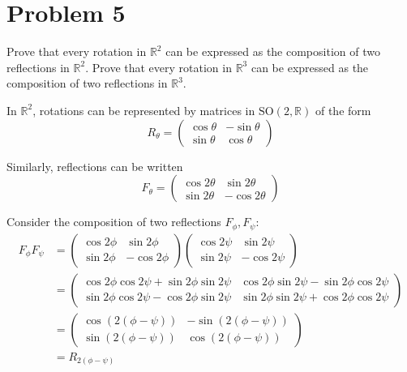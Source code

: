 \documentclass[12pt]{article}
\newcommand{\R}{\mathbb{R}}
\newcommand{\SO}{\text{SO}}
\begin{document}
\section*{Problem 5} Prove that every rotation in $\R^{2}$ can be expressed as the composition of two reflections in $\R^{2}$.  Prove that every rotation in $\R^{3}$ can be expressed as the composition of two reflections in $\R^{3}$.

    \color{blue}
        In $\R^2$, rotations can be represented by matrices in $\SO(2, \R)$ of the form 
        \[R_{\theta} = \begin{pmatrix}
            \cos \theta & -\sin \theta\\ 
            \sin \theta & \cos \theta
        \end{pmatrix}\] 

        Similarly, reflections can be written 
        \[F_{\theta} = \begin{pmatrix}
            \cos 2\theta & \sin 2\theta\\ 
            \sin 2\theta & -\cos 2\theta 
        \end{pmatrix}\]

        Consider the composition of two reflections $F_{\phi}, F_{\psi}$: 
        \begin{align*}
            F_{\phi}F_{\psi} &= \begin{pmatrix}
                \cos 2\phi & \sin 2\phi\\ 
                \sin 2\phi & -\cos 2\phi 
            \end{pmatrix} \begin{pmatrix}
                \cos 2\psi & \sin 2\psi\\ 
                \sin 2\psi & -\cos 2\psi
            \end{pmatrix}\\ 
            &= \begin{pmatrix}
                \cos 2\phi \cos 2\psi + \sin 2\phi \sin 2\psi & \cos 2\phi \sin 2\psi - \sin 2\phi \cos 2\psi\\ 
                \sin 2\phi \cos 2\psi - \cos 2\phi \sin 2\psi & \sin 2\phi \sin 2\psi + \cos 2\phi \cos 2\psi
            \end{pmatrix}\\ 
            &= \begin{pmatrix}
                \cos(2(\phi - \psi)) & -\sin(2(\phi - \psi))\\
                \sin(2(\phi - \psi)) & \cos(2(\phi - \psi))
            \end{pmatrix}\\ 
            &= R_{2(\phi - \psi)}
        \end{align*}
\end{document}
